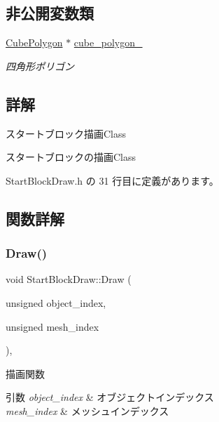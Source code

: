 \subsection*{非公開変数類}
\begin{DoxyCompactItemize}
\item 
\mbox{\hyperlink{class_cube_polygon}{Cube\+Polygon}} $\ast$ \mbox{\hyperlink{class_start_block_draw_a5aa6b756335a16f05c9b0d4457eb0883}{cube\+\_\+polygon\+\_\+}}
\begin{DoxyCompactList}\small\item\em 四角形ポリゴン \end{DoxyCompactList}\end{DoxyCompactItemize}


\subsection{詳解}
スタートブロック描画\+Class 

スタートブロックの描画\+Class 

 Start\+Block\+Draw.\+h の 31 行目に定義があります。



\subsection{関数詳解}
\mbox{\label{class_start_block_draw_a280430a290cf9ea32117f0c460a0f775}} 
\subsubsection{\texorpdfstring{Draw()}{Draw()}}
{\footnotesize\ttfamily void Start\+Block\+Draw\+::\+Draw (\begin{DoxyParamCaption}\item[{unsigned}]{object\+\_\+index,  }\item[{unsigned}]{mesh\+\_\+index }\end{DoxyParamCaption})\hspace{0.3cm}{\ttfamily [override]}, {\ttfamily [virtual]}}



描画関数 


\begin{DoxyParams}{引数}
{\em object\+\_\+index} & オブジェクトインデックス \\
\hline
{\em mesh\+\_\+index} & メッシュインデックス \\
\hline
\end{DoxyParams}

